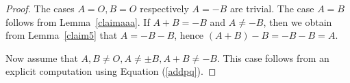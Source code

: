 \documentclass[12pt]{amsart}
\theoremstyle{plain}
\theoremstyle{remark}
\theoremstyle{definition}
\def\en{\end{enumerate}}
\begin{document}
\begin{proof}
The cases $A=O, B=O$ respectively $A=-B$ are trivial.
The case $A=B$ follows from Lemma~\ref{claimaaa}.
If $A+B=-B$ and $A\ne -B$, then we obtain from  Lemma~\ref{claim5} that $A=-B-B$, hence $(A+B)-B=-B-B=A$.

Now assume that $A,B\ne O, A\ne \pm B, A+B\ne -B$.
This case follows from an explicit computation using Equation (\ref{addpq}).
\end{proof}
\end{document}
